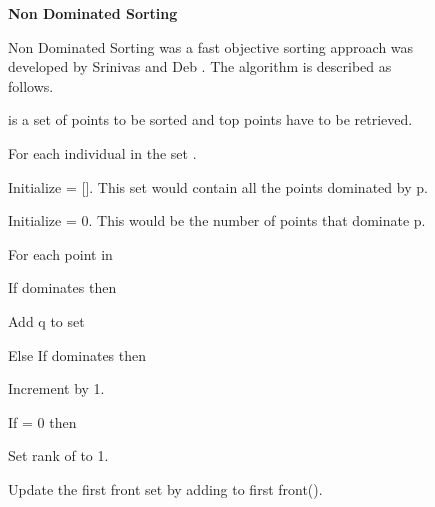 \begin{figure}
    \begin{mdframed}[backgroundcolor=white]
        \begin{center}
            {\bf Non Dominated Sorting}\\
        \end{center}
        Non Dominated Sorting was a fast objective sorting approach was developed by Srinivas and Deb \cite{srinivas94}. The algorithm is described as follows.
        \bigskip
        \begin{compactitem}
            \item {} is a set of points to be sorted and  top points have to be retrieved.
            \item For each individual  in the set .
            \begin{compactitem}
                \item Initialize  = []. This set would contain all the points dominated by p.
                \item Initialize  = 0. This would be the number of points that dominate p.
                \item For each point  in 
                \begin{compactitem}
                    \item If  dominates  then
                        \begin{compactitem}
                            \item Add q to set 
                        \end{compactitem}
                    \item Else If  dominates  then
                        \begin{compactitem}
                            \item Increment  by 1.
                        \end{compactitem}
                \end{compactitem}
            \end{compactitem}
            \item If  = 0 then
                \begin{compactitem}
                    \item Set rank of  to 1.
                    \item Update the first front set by adding  to first front().

\end{compactitem}
\end{compactitem}
\end{mdframed}
\end{figure}
